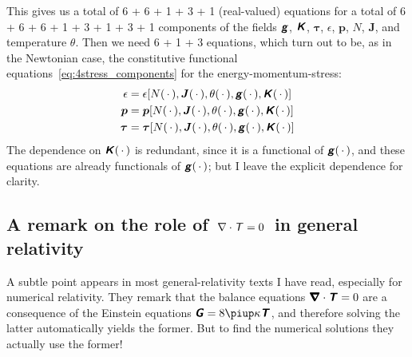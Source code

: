 \documentclass[\ifafour a4paper,12pt,\else a5paper,10pt,\fi%
onecolumn,oneside,article,%
british%
]{memoir}
\theoremstyle{remark}
\theoremstyle{innote}
\newcommand*{\mathte}[1]{\textbf{\textit{\textsf{#1}}}}
\newcommand*{\pu}{\piup}%
\newcommand*{\dotv}{\mathord{\,\cdot\,}}%
\renewcommand*{\|}[1][]{\nonscript\,#1\vert\nonscript\;\mathopen{}}
\newcommand*{\eqn}{eq.}%
\newcommand*{\yd}{N}
\newcommand*{\yjj}{J}
\newcommand*{\yj}{\bm{\yjj}}
\newcommand*{\yGG}{G}
\newcommand*{\yG}{\mathte{\yGG}}
\newcommand*{\yTT}{\tau}
\newcommand*{\yT}{\bm{\yTT}}
\newcommand*{\yTTf}{T}
\newcommand*{\yTf}{\mathte{\yTTf}}
\newcommand*{\ygg}{g}
\newcommand*{\yg}{\mathte{\ygg}}
\newcommand*{\yKK}{K}
\newcommand*{\yK}{\mathte{\yKK}}
\newcommand*{\ypp}{p}
\newcommand*{\yp}{\bm{\ypp}}
\newcommand*{\ye}{\epsilon}
\newcommand*{\yte}{\theta}
\newcommand*{\yDi}{\pmb{\bm{\nabla}}}
\begin{document}
This gives us a total of 6 + 6 + 1 + 3 + 1 (real-valued) equations for a
total of 6 + 6 + 6 + 1 + 3 + 1 + 3 + 1 components of the fields $\yg$,
$\yK$, $\yT$, $\ye$, $\yp$, $\yd$, $\yj$, and temperature $\yte$. Then we
need 6 + 1 + 3 equations, which turn out to be, as in the Newtonian case,
the constitutive functional equations~\eqref{eq:4stress_components} for
the energy-momentum-stress:
\begin{subequations}\label{eq:constitutive_4stress_gen-rel}
  \begin{align}
    \label{eq:constit_energy_gen-rel}
    \ye &= \ye[\yd(\dotv),\yj(\dotv),\yte(\dotv),\yg(\dotv), \yK(\dotv)]
    \\
    \label{eq:constit_energy-flux_gen-rel}
    \yp &= \yp[\yd(\dotv),\yj(\dotv),\yte(\dotv),\yg(\dotv), \yK(\dotv)]
    \\
    \label{eq:constit_3stress_gen-rel}
    \yT &= \yT[\yd(\dotv),\yj(\dotv),\yte(\dotv),\yg(\dotv), \yK(\dotv)]
  \end{align}
\end{subequations}
The dependence on $\yK(\dotv)$ is redundant, since it is a functional of
$\yg(\dotv)$, and these equations are already functionals of $\yg(\dotv)$;
but I leave the explicit dependence for clarity.



\subsection{A remark on the role of
  \,$\nabla\cdot\textsf{\textit{T}} = 0$\, in general relativity}
\label{sec:divergence_4stress}

A subtle point appears in most general-relativity texts I have read,
especially for numerical relativity. They remark that the balance equations
$\yDi\cdot\yTf = 0$ are a consequence of the Einstein equations
$\yG = 8\pu \kappa \yTf$, and therefore solving the latter automatically
yields the former. But to find the numerical solutions they actually use
the former!
\end{document}
